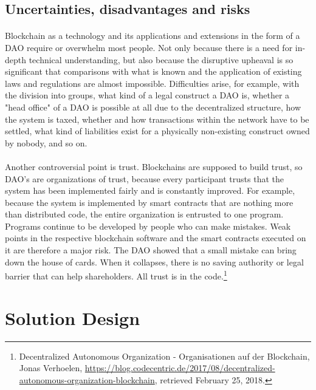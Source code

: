 \documentclass{scrartcl}
\begin{document}
	\subsection{Uncertainties, disadvantages and risks}
	
	\paragraph{}
	Blockchain as a technology and its applications and extensions in the form of a DAO require or overwhelm most people.  Not only because there is a need for in-depth technical understanding, but also because the disruptive upheaval is so significant that comparisons with what is known and the application of existing laws and regulations are almost impossible. Difficulties arise, for example, with the division into groups, what kind of a legal construct a DAO is, whether a "head office" of a DAO is possible at all due to the decentralized structure, how the system is taxed, whether and how transactions within the network have to be settled, what kind of liabilities exist for a physically non-existing construct owned by nobody, and so on.
	
	\paragraph{}
	Another controversial point is trust. Blockchains are supposed to build trust, so DAO's are organizations of trust, because every participant trusts that the system has been implemented fairly and is constantly improved. For example, because the system is implemented by smart contracts that are nothing more than distributed code, the entire organization is entrusted to one program. Programs continue to be developed by people who can make mistakes. Weak points in the respective blockchain software and the smart contracts executed on it are therefore a major risk. The DAO showed that a small mistake can bring down the house of cards. When it collapses, there is no saving authority or legal barrier that can help shareholders. All trust is in the code.\footnote{Decentralized Autonomous Organization - Organisationen auf der Blockchain, Jonas Verhoelen, \url{https://blog.codecentric.de/2017/08/decentralized-autonomous-organization-blockchain}, retrieved February 25, 2018.}
    
    \section{Solution Design}
   
\end{document}
